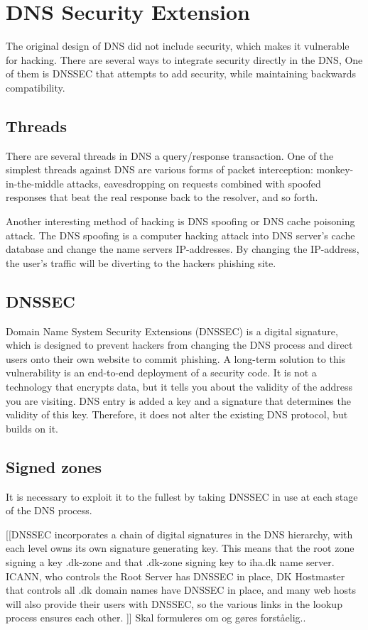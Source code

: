 
\section{DNS Security Extension}
\label{DNS Security Extensions}
The original design of DNS did not include security, which makes it vulnerable for hacking.
There are several ways to integrate security directly in the DNS, One of them is DNSSEC that attempts to add security, while maintaining backwards compatibility.

\subsection{Threads}
There are several threads in DNS a query/response transaction.
One of the simplest threads against DNS are various forms of packet interception: monkey-in-the-middle attacks, eavesdropping on requests combined with spoofed responses that beat the real response back to the resolver, and so forth.

Another interesting method of hacking is DNS spoofing or DNS cache poisoning attack.
The DNS spoofing is a computer hacking attack into DNS server's cache database and change the name servers IP-addresses. By changing the IP-address, the user's traffic will be diverting to the hackers phishing site.

\subsection{DNSSEC}
Domain Name System Security Extensions (DNSSEC) is a digital signature, which is designed to prevent hackers from changing the DNS process and direct users onto their own website to commit phishing. A long-term solution to this vulnerability is an end-to-end deployment of a security code. It is not a technology that encrypts data, but it tells you about the validity of the address you are visiting. DNS entry is added a key and a signature that determines the validity of this key. Therefore, it does not alter the existing DNS protocol, but builds on it.

\subsection{Signed zones}
It is necessary to exploit it to the fullest by taking DNSSEC in use at each stage of the DNS process.

[[DNSSEC incorporates a chain of digital signatures in the DNS hierarchy, with each level owns its own signature generating key. This means that the root zone signing a key .dk-zone and that .dk-zone signing key to iha.dk name server. ICANN, who controls the Root Server has DNSSEC in place, DK Hostmaster that controls all .dk domain names have DNSSEC in place, and many web hosts will also provide their users with DNSSEC, so the various links in the lookup process ensures each other. ]] Skal formuleres om og gøres forståelig.. 